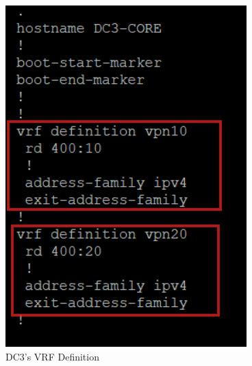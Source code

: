 \documentclass[12pt,english]{report}
\begin{document}
\begin{figure}[H]
    \begin{minipage}[b]{0.4\textwidth} %
        \centering
        \includegraphics[width=\textwidth]{chapitre 3/12.png}
        \caption{DC3's VRF Definition}
        \label{fig:DC3's VRF Definition}
    \end{minipage}
    \hfill %
    \begin{minipage}[b]{0.48\textwidth} %
        \centering

\end{minipage}
\end{figure}
\end{document}
